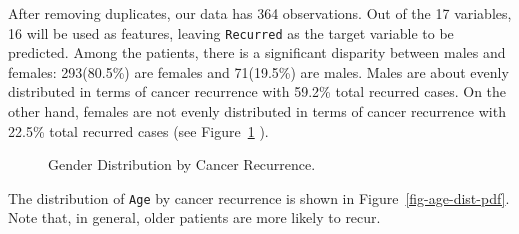 \documentclass[
  letterpaper,
  DIV=11,
  numbers=noendperiod]{scrartcl}
\begin{document}
After removing duplicates, our data has 364 observations. Out of the 17
variables, 16 will be used as features, leaving \texttt{Recurred} as the
target variable to be predicted. Among the patients, there is a
significant disparity between males and females: 293(80.5\%) are females
and 71(19.5\%) are males. Males are about evenly distributed in terms of
cancer recurrence with 59.2\% total recurred cases. On the other hand,
females are not evenly distributed in terms of cancer recurrence with
22.5\% total recurred cases (see Figure~\ref{fig-gender-dist-pdf} ).

\label{cell-fig-gender-dist-pdf}
\begin{figure}[H]


\caption{\label{fig-gender-dist-pdf}Gender Distribution by Cancer
Recurrence.}

\end{figure}%

The distribution of \texttt{Age} by cancer recurrence is shown in
Figure~\ref{fig-age-dist-pdf}. Note that, in general, older patients are
more likely to recur.
\end{document}
